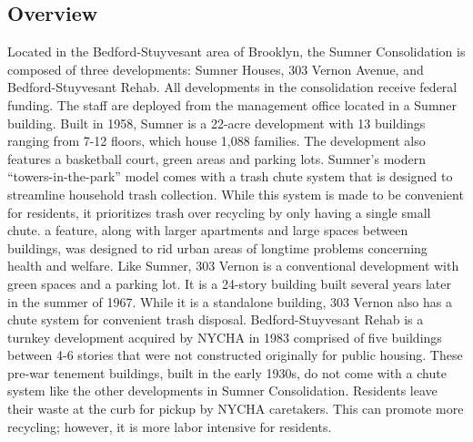\pagestyle{plain}
\pagecolor{ccteal}
\pagebreak
{}
\pagestyle{fancy}
\fancyhf{}
\renewcommand{\chaptermark}[1]{\markboth{#1}{}}
\fancyfoot[LE,RO]{\thepage}

	\begin{minipage}[t][.5\textheight][t]{\textwidth}
	\textcolor{ccteal}{\section{Overview}}
	Located in the Bedford-Stuyvesant area of Brooklyn, the Sumner Consolidation is composed of three developments: Sumner Houses, 303 Vernon Avenue, and Bedford-Stuyvesant Rehab. All developments in the consolidation 	receive federal funding. The staff are deployed from the management office located in a Sumner building. Built in 1958, Sumner is a 22-acre development with 13 buildings ranging from
	7-12 floors, which house 1,088 families. The development also features a basketball court, green areas
	and parking lots. Sumner's modern ``towers-in-the-park'' model comes with a trash chute system that is
	designed to streamline household trash collection. While this system is made to be convenient for
	residents, it prioritizes trash over recycling by only having a single small chute. a feature, along with
	larger apartments and large spaces between buildings, was designed to rid urban areas of longtime
	problems concerning health and welfare.
	Like Sumner, 303 Vernon is a conventional development with green spaces and a parking lot. It is a
	24-story building built several years later in the summer of 1967. While it is a standalone building, 303
	Vernon also has a chute system for convenient trash disposal.
	Bedford-Stuyvesant Rehab is a turnkey development acquired by NYCHA in 1983 comprised of five
	buildings between 4-6 stories that were not constructed originally for public housing. These pre-war
	tenement buildings, built in the early 1930s, do not come with a chute system like the other
	developments in Sumner Consolidation. Residents leave their waste at the curb for pickup by NYCHA
	caretakers. This can promote more recycling; however, it is more labor intensive for residents.
	
	\end{minipage}
